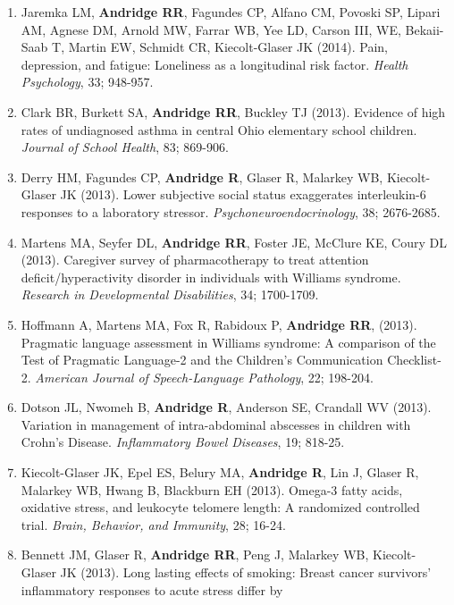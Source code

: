 \documentclass[
  english,
  letterpaper,
  DIV=11,
  numbers=noendperiod]{scrartcl}
\begin{document}
\begin{enumerate}
  CL, Malarkey WB, Emery CF, Layman R, Mrozek EE, Glaser R (2014).
  Yoga's impact on inflammation, mood, and fatigue in breast cancer
  survivors: A randomized controlled trial. \emph{Journal of Clinical
  Oncology}, 32; 1040-1049.
\item
  Jaremka LM, \textbf{Andridge RR}, Fagundes CP, Alfano CM, Povoski SP,
  Lipari AM, Agnese DM, Arnold MW, Farrar WB, Yee LD, Carson III, WE,
  Bekaii-Saab T, Martin EW, Schmidt CR, Kiecolt-Glaser JK (2014). Pain,
  depression, and fatigue: Loneliness as a longitudinal risk factor.
  \emph{Health Psychology}, 33; 948-957.
\item
  Clark BR, Burkett SA, \textbf{Andridge RR}, Buckley TJ (2013).
  Evidence of high rates of undiagnosed asthma in central Ohio
  elementary school children. \emph{Journal of School Health}, 83;
  869-906.
\item
  Derry HM, Fagundes CP, \textbf{Andridge R}, Glaser R, Malarkey WB,
  Kiecolt-Glaser JK (2013). Lower subjective social status exaggerates
  interleukin-6 responses to a laboratory stressor.
  \emph{Psychoneuroendocrinology}, 38; 2676-2685.
\item
  Martens MA, Seyfer DL, \textbf{Andridge RR}, Foster JE, McClure KE,
  Coury DL (2013). Caregiver survey of pharmacotherapy to treat
  attention deficit/hyperactivity disorder in individuals with Williams
  syndrome. \emph{Research in Developmental Disabilities}, 34;
  1700-1709.
\item
  Hoffmann A, Martens MA, Fox R, Rabidoux P, \textbf{Andridge RR},
  (2013). Pragmatic language assessment in Williams syndrome: A
  comparison of the Test of Pragmatic Language-2 and the Children's
  Communication Checklist-2. \emph{American Journal of Speech-Language
  Pathology}, 22; 198-204.
\item
  Dotson JL, Nwomeh B, \textbf{Andridge R}, Anderson SE, Crandall WV
  (2013). Variation in management of intra-abdominal abscesses in
  children with Crohn's Disease. \emph{Inflammatory Bowel Diseases}, 19;
  818-25.
\item
  Kiecolt-Glaser JK, Epel ES, Belury MA, \textbf{Andridge R}, Lin J,
  Glaser R, Malarkey WB, Hwang B, Blackburn EH (2013). Omega-3 fatty
  acids, oxidative stress, and leukocyte telomere length: A randomized
  controlled trial. \emph{Brain, Behavior, and Immunity}, 28; 16-24.
\item
  Bennett JM, Glaser R, \textbf{Andridge RR}, Peng J, Malarkey WB,
  Kiecolt-Glaser JK (2013). Long lasting effects of smoking: Breast
  cancer survivors' inflammatory responses to acute stress differ by

\end{enumerate}
\end{document}
